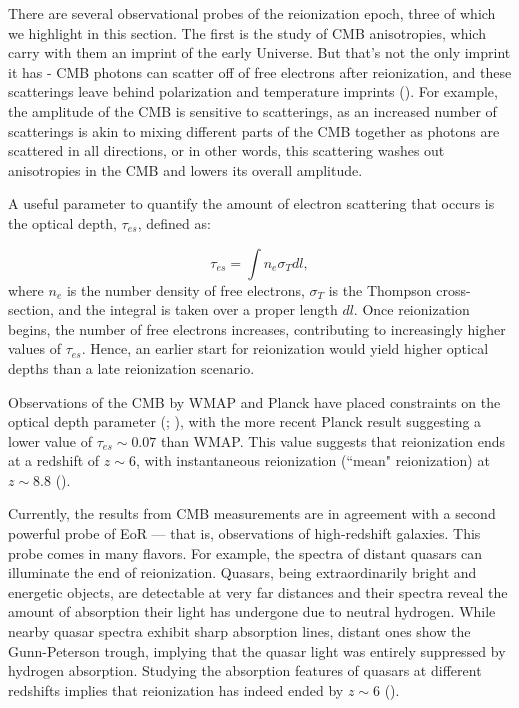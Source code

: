 There are several observational probes of the reionization epoch, three of which we highlight in this section. The first is the study of CMB anisotropies, which carry with them an imprint of the early Universe. But that's not the only imprint it has - CMB photons can scatter off of free electrons after reionization, and these scatterings leave behind polarization and temperature imprints (\citealt{haiman_knox_1999}). For example, the amplitude of the CMB is sensitive to scatterings, as an increased number of scatterings is akin to mixing different parts of the CMB together as photons are scattered in all directions, or in other words, this scattering washes out anisotropies in the CMB and lowers its overall amplitude. 

A useful parameter to quantify the amount of electron scattering that occurs is the optical depth, $\tau_{es}$, defined as:

\begin{equation}
\tau_{es} = \int n_{e}\sigma_{T} dl,
\end{equation}
where $n_{e}$ is the number density of free electrons, $\sigma_{T}$ is the Thompson cross-section, and the integral is taken over a proper length $dl$. Once reionization begins, the number of free electrons increases, contributing to increasingly higher values of $\tau_{es}$. Hence, an earlier start for reionization would yield higher optical depths than a late reionization scenario. 

Observations of the CMB by WMAP and Planck have placed constraints on the optical depth parameter (\citealt{hinshaw_et_al2013}; \citealt{planck2016}), with the more recent Planck result suggesting a lower value of $\tau_{es} \sim 0.07$ than WMAP. This value suggests that reionization ends at a redshift of $z \sim 6$, with instantaneous reionization (``mean" reionization) at $z \sim 8.8$ (\citealt{planck2016}).

Currently, the results from CMB measurements are in agreement with a second powerful probe of EoR --- that is, observations of high-redshift galaxies. This probe comes in many flavors. For example, the spectra of distant quasars can illuminate the end of reionization. Quasars, being extraordinarily bright and energetic objects, are detectable at very far distances and their spectra reveal the amount of absorption their light has undergone due to neutral hydrogen. While nearby quasar spectra exhibit sharp absorption lines, distant ones show the Gunn-Peterson trough, implying that the quasar light was entirely suppressed by hydrogen absorption. Studying the absorption features of quasars at different redshifts implies that reionization has indeed ended by $z \sim 6$ (\citealt{becker_et_al2001}). 

